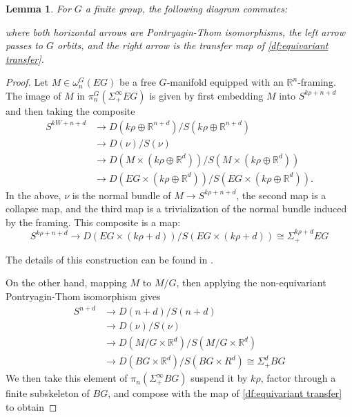 \documentclass[11pt]{amsart}
\newcommand{\R}{\mathbb R}
\newcommand{\tr}{\textup{tr}\,}
\theoremstyle{plain}   %
\newtheorem{lem}[thm]{Lemma}
\theoremstyle{definition}
\theoremstyle{remark}
\numberwithin{equation}{section}
\begin{document}
\begin{lem}\label{lem:orbits transfer}
For $G$ a finite group, the following diagram commutes:
\begin{figure}[H]
\center
{}
\end{figure}
where both horizontal arrows are Pontryagin-Thom isomorphisms, the left arrow passes to $G$ orbits, and the right arrow is the transfer map of \cref{df:equivariant transfer}.
\end{lem}
\begin{proof}
Let $M\in \omega_n^G(EG)$ be a free $G$-manifold equipped with an $\R^n$-framing. The image of $M$ in $\pi_n^G(\Sigma_+^\infty EG)$ is given by first embedding $M$ into  $S^{k\rho+n+d}$ and then taking the composite
\begin{align*}
S^{kW+n+d}
& \to D(k\rho\oplus\R^{n+d})/S(k\rho\oplus\R^{n+d})\\
& \to D(\nu)/S(\nu)\\
& \to D(M\times (k\rho\oplus\R^d))/S(M\times(k\rho\oplus\R^d))\\
&\to D(EG\times(k\rho\oplus\R^d))/S(EG\times(k\rho\oplus\R^d)).
\end{align*}
In the above, $\nu$ is the normal bundle of $M\to S^{k\rho+n+d}$, the second map is a collapse map, and the third map is a trivialization of the normal bundle induced by the framing. This composite is a map:
\begin{equation}\label{eq:horizontal}
S^{k\rho+n+d}\longrightarrow D(EG\times(k\rho+d))/S(EG\times (k\rho+d))\cong \Sigma_+^{k\rho+d}EG
\end{equation}

The details of this construction can be found in \cite[Definition 2.48]{williams_framed_PT}.

On the other hand, mapping $M$ to $M/G$, then applying the non-equivariant Pontryagin-Thom isomorphism gives
\begin{align*}
S^{n+d}
& \to D(n+d)/S(n+d)\\
& \to D(\nu)/S(\nu)\\
& \to D(M/G\times \R^d)/S(M/G\times \R^d)\\
& \to D(BG\times \R^d)/S(BG\times R^d)\cong \Sigma_+^d BG 
\end{align*}
We then take this element of $\pi_n(\Sigma_+^\infty BG)$ suspend it by $k\rho$, factor through a finite subskeleton of $BG$, and compose with the map of \cref{df:equivariant transfer} to obtain


\end{proof}
\end{document}
